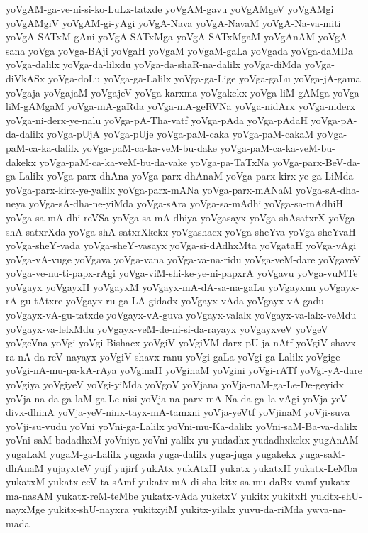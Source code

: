 {yoVgAM-ga-ve-ni-si-ko-LuLx-tatxde
yoVgAM-gavu
yoVgAMgeV
yoVgAMgi
yoVgAMgiV
yoVgAM-gi-yAgi
yoVgA-Nava
yoVgA-NavaM
yoVgA-Na-va-miti
yoVgA-SATxM-gAni
yoVgA-SATxMga
yoVgA-SATxMgaM
yoVgAnAM
yoVgA-sana
yoVga
yoVga-BAji
yoVgaH
yoVgaM
yoVgaM-gaLa
yoVgada
yoVga-daMDa
yoVga-dalilx
yoVga-da-lilxdu
yoVga-da-shaR-na-dalilx
yoVga-diMda
yoVga-diVkASx
yoVga-doLu
yoVga-ga-Lalilx
yoVga-ga-Lige
yoVga-gaLu
yoVga-jA-gama
yoVgaja
yoVgajaM
yoVgajeV
yoVga-karxma
yoVgakekx
yoVga-liM-gAMga
yoVga-liM-gAMgaM
yoVga-mA-gaRda
yoVga-mA-geRVNa
yoVga-nidArx
yoVga-niderx
yoVga-ni-derx-ye-nalu
yoVga-pA-Tha-vatf
yoVga-pAda
yoVga-pAdaH
yoVga-pA-da-dalilx
yoVga-pUjA
yoVga-pUje
yoVga-paM-caka
yoVga-paM-cakaM
yoVga-paM-ca-ka-dalilx
yoVga-paM-ca-ka-veM-bu-dake
yoVga-paM-ca-ka-veM-bu-dakekx
yoVga-paM-ca-ka-veM-bu-da-vake
yoVga-pa-TaTxNa
yoVga-parx-BeV-da-ga-Lalilx
yoVga-parx-dhAna
yoVga-parx-dhAnaM
yoVga-parx-kirx-ye-ga-LiMda
yoVga-parx-kirx-ye-yalilx
yoVga-parx-mANa
yoVga-parx-mANaM
yoVga-sA-dha-neya
yoVga-sA-dha-ne-yiMda
yoVga-sAra
yoVga-sa-mAdhi
yoVga-sa-mAdhiH
yoVga-sa-mA-dhi-reVSa
yoVga-sa-mA-dhiya
yoVgasayx
yoVga-shAsatxrX
yoVga-shA-satxrXda
yoVga-shA-satxrXkekx
yoVgashacx
yoVga-sheYva
yoVga-sheYvaH
yoVga-sheY-vada
yoVga-sheY-vasayx
yoVga-si-dAdhxMta
yoVgataH
yoVga-vAgi
yoVga-vA-vuge
yoVgava
yoVga-vana
yoVga-va-na-ridu
yoVga-veM-dare
yoVgaveV
yoVga-ve-nu-ti-papx-rAgi
yoVga-viM-shi-ke-ye-ni-papxrA
yoVgavu
yoVga-vuMTe
yoVgayx
yoVgayxH
yoVgayxM
yoVgayx-mA-dA-sa-na-gaLu
yoVgayxnu
yoVgayx-rA-gu-tAtxre
yoVgayx-ru-ga-LA-gidadx
yoVgayx-vAda
yoVgayx-vA-gadu
yoVgayx-vA-gu-tatxde
yoVgayx-vA-guva
yoVgayx-valalx
yoVgayx-va-lalx-veMdu
yoVgayx-va-lelxMdu
yoVgayx-veM-de-ni-si-da-rayayx
yoVgayxveV
yoVgeV
yoVgeVna
yoVgi
yoVgi-Bishacx
yoVgiV
yoVgiVM-darx-pU-ja-nAtf
yoVgiV-shavx-ra-nA-da-reV-nayayx
yoVgiV-shavx-ranu
yoVgi-gaLa
yoVgi-ga-Lalilx
yoVgige
yoVgi-nA-mu-pa-kA-rAya
yoVginaH
yoVginaM
yoVgini
yoVgi-rATf
yoVgi-yA-dare
yoVgiya
yoVgiyeV
yoVgi-yiMda
yoVgoV
yoVjana
yoVja-naM-ga-Le-De-geyidx
yoVja-na-da-ga-laM-ga-Le-nisi
yoVja-na-parx-mA-Na-da-ga-la-vAgi
yoVja-yeV-divx-dhinA
yoVja-yeV-ninx-tayx-mA-tamxni
yoVja-yeVtf
yoVjinaM
yoVji-suva
yoVji-su-vudu
yoVni
yoVni-ga-Lalilx
yoVni-mu-Ka-dalilx
yoVni-saM-Ba-va-dalilx
yoVni-saM-badadhxM
yoVniya
yoVni-yalilx
yu
yudadhx
yudadhxkekx
yugAnAM
yugaLaM
yugaM-ga-Lalilx
yugada
yuga-dalilx
yuga-juga
yugakekx
yuga-saM-dhAnaM
yujayxteV
yujf
yujirf
yukAtx
yukAtxH
yukatx
yukatxH
yukatx-LeMba
yukatxM
yukatx-ceV-ta-sAmf
yukatx-mA-di-sha-kitx-sa-mu-daBx-vamf
yukatx-ma-nasAM
yukatx-reM-teMbe
yukatx-vAda
yuketxV
yukitx
yukitxH
yukitx-shU-nayxMge
yukitx-shU-nayxra
yukitxyiM
yukitx-yilalx
yuvu-da-riMda
ywva-na-mada
}
